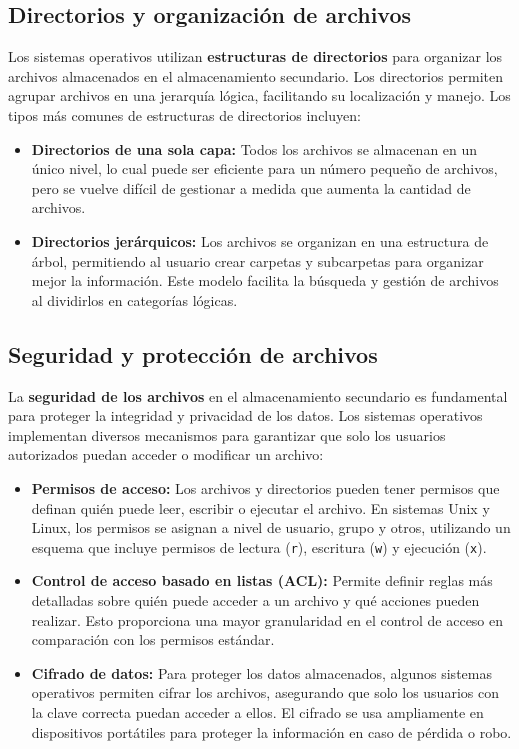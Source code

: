 \subsection{Directorios y organización de archivos}

Los sistemas operativos utilizan \textbf{estructuras de directorios} para organizar los archivos almacenados en el almacenamiento secundario. Los directorios permiten agrupar archivos en una jerarquía lógica, facilitando su localización y manejo. Los tipos más comunes de estructuras de directorios incluyen:

\begin{itemize}
	\item \textbf{Directorios de una sola capa:} Todos los archivos se almacenan en un único nivel, lo cual puede ser eficiente para un número pequeño de archivos, pero se vuelve difícil de gestionar a medida que aumenta la cantidad de archivos.
	\item \textbf{Directorios jerárquicos:} Los archivos se organizan en una estructura de árbol, permitiendo al usuario crear carpetas y subcarpetas para organizar mejor la información. Este modelo facilita la búsqueda y gestión de archivos al dividirlos en categorías lógicas.

\end{itemize}

\subsection{Seguridad y protección de archivos}

La \textbf{seguridad de los archivos} en el almacenamiento secundario es fundamental para proteger la integridad y privacidad de los datos. Los sistemas operativos implementan diversos mecanismos para garantizar que solo los usuarios autorizados puedan acceder o modificar un archivo:

\begin{itemize}
	\item \textbf{Permisos de acceso:} Los archivos y directorios pueden tener permisos que definan quién puede leer, escribir o ejecutar el archivo. En sistemas Unix y Linux, los permisos se asignan a nivel de usuario, grupo y otros, utilizando un esquema que incluye permisos de lectura (\texttt{r}), escritura (\texttt{w}) y ejecución (\texttt{x}).
	\item \textbf{Control de acceso basado en listas (ACL):} Permite definir reglas más detalladas sobre quién puede acceder a un archivo y qué acciones pueden realizar. Esto proporciona una mayor granularidad en el control de acceso en comparación con los permisos estándar.
	\item \textbf{Cifrado de datos:} Para proteger los datos almacenados, algunos sistemas operativos permiten cifrar los archivos, asegurando que solo los usuarios con la clave correcta puedan acceder a ellos. El cifrado se usa ampliamente en dispositivos portátiles para proteger la información en caso de pérdida o robo.
\end{itemize}

